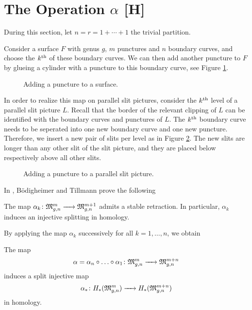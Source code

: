 \section{The Operation \texorpdfstring{$\alpha$}{alpha} [H]}
\label{homology_operations:alpha}
During this section, let $n = r = 1 + \dotsb + 1$ the trivial partition.

Consider a surface $F$ with genus $g$, $m$ punctures and $n$ boundary curves, and choose the $k^{\text{th}}$ of these boundary curves. 
We can then add another puncture to $F$ by glueing a cylinder with a puncture to this boundary curve,
see Figure \ref{map_A_on_surfaces}.

\begin{figure}[ht]
\centering
\def\svgwidth{0.3\columnwidth}

\caption{\label{map_A_on_surfaces} Adding a puncture to a surface.}
\end{figure}

In order to realize this map on parallel slit pictures, consider the $k^{\text{th}}$ level of a parallel slit picture $L$.
Recall that the border of the relevant clipping of $L$ can be identified with the boundary curves and punctures of $L$. 
The $k^{\text{th}}$ boundary curve needs to be seperated into one new boundary curve and one new puncture.
Therefore, we insert a new pair of slits per level as in Figure \ref{map_A_on_cells}.
The new slits are longer than any other slit of the slit picture, and they are placed below respectively above all other slits.

\begin{figure}[ht]
\centering
{}
\caption{\label{map_A_on_cells} Adding a puncture to a parallel slit picture.}
\end{figure}

In \cite[Theorem 1.3]{BoedigheimerTillmann2001}, Bödigheimer and Tillmann prove the following

\begin{thm}
   The map $\alpha_k \colon \mathfrak{M}^m_{g,n} \xrightarrow{\hspace{6pt}{}\hspace{6pt}} \mathfrak{M}^{m+1}_{g,n}$ admits a stable retraction.
   In particular, $\alpha_k$ induces an injective splitting in homology.
\end{thm}

By applying the map $\alpha_k$ successively for all $k = 1, \dotsc, n$, we obtain 

\begin{defprop}
\label{alpha}
The map
\[
   \alpha = \alpha_n \circ \dotsc \circ \alpha_1 \colon \mathfrak{M}^m_{g,n} \xrightarrow{\hspace{6pt}{}\hspace{6pt}} \mathfrak{M}^{m+n}_{g,n}
\]
induces a split injective map
\[
   \alpha_* \colon H_*(\mathfrak{M}^m_{g,n}) \xrightarrow{\hspace{6pt}{}\hspace{6pt}} H_*(\mathfrak{M}^{m+n}_{g,n})
\]
in homology.
\end{defprop}

